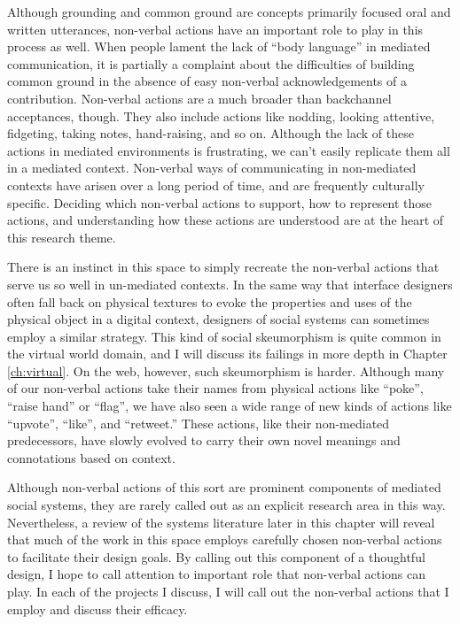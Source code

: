 Although grounding and common ground are concepts primarily focused oral and written utterances, non-verbal actions have an important role to play in this process as well. When people lament the lack of ``body language'' in mediated communication, it is partially a complaint about the difficulties of building common ground in the absence of easy non-verbal acknowledgements of a contribution. Non-verbal actions are a much broader than backchannel acceptances, though. They also include actions like nodding, looking attentive, fidgeting, taking notes, hand-raising, and so on. Although the lack of these actions in mediated environments is frustrating, we can't easily replicate them all in a mediated context. Non-verbal ways of communicating in non-mediated contexts have arisen over a long period of time, and are frequently culturally specific. Deciding which non-verbal actions to support, how to represent those actions, and understanding how these actions are understood are at the heart of this research theme.

There is an instinct in this space to simply recreate the non-verbal actions that serve us so well in un-mediated contexts. In the same way that interface designers often fall back on physical textures to evoke the properties and uses of the physical object in a digital context, designers of social systems can sometimes employ a similar strategy. This kind of social skeumorphism is quite common in the virtual world domain, and I will discuss its failings in more depth in Chapter \ref{ch:virtual}. On the web, however, such skeumorphism is harder. Although many of our non-verbal actions take their names from physical actions like ``poke'', ``raise hand'' or ``flag'', we have also seen a wide range of new kinds of actions like ``upvote'', ``like'', and ``retweet.'' These actions, like their non-mediated predecessors, have slowly evolved to carry their own novel meanings and connotations based on context.

Although non-verbal actions of this sort are prominent components of mediated social systems, they are rarely called out as an explicit research area in this way. Nevertheless, a review of the systems literature later in this chapter will reveal that much of the work in this space employs carefully chosen non-verbal actions to facilitate their design goals. By calling out this component of a thoughtful design, I hope to call attention to important role that non-verbal actions can play. In each of the projects I discuss, I will call out the non-verbal actions that I employ and discuss their efficacy.


